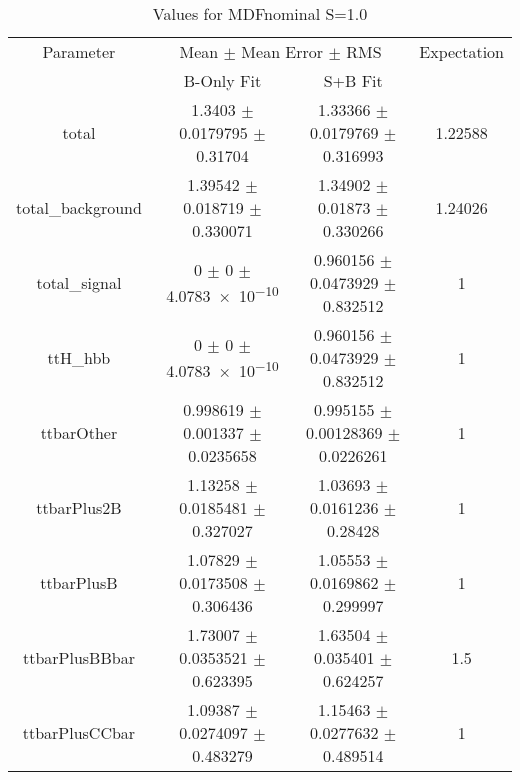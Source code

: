 \begin{table}
\centering
\caption{Values for MDFnominal S=1.0}
\begin{tabular}{cccc}
\toprule
Parameter & \multicolumn{2}{c}{Mean $\pm$ Mean Error $\pm$ RMS} & Expectation\\
 & B-Only Fit & S+B Fit & \\
\midrule
total & \num{1.3403} $\pm$ \num{0.0179795} $\pm$ \num{0.31704} & \num{1.33366} $\pm$ \num{0.0179769} $\pm$ \num{0.316993} & \num{1.22588}\\
total\_background & \num{1.39542} $\pm$ \num{0.018719} $\pm$ \num{0.330071} & \num{1.34902} $\pm$ \num{0.01873} $\pm$ \num{0.330266} & \num{1.24026}\\
total\_signal & \num{0} $\pm$ \num{0} $\pm$ \num{4.0783e-10} & \num{0.960156} $\pm$ \num{0.0473929} $\pm$ \num{0.832512} & \num{1}\\
ttH\_hbb & \num{0} $\pm$ \num{0} $\pm$ \num{4.0783e-10} & \num{0.960156} $\pm$ \num{0.0473929} $\pm$ \num{0.832512} & \num{1}\\
ttbarOther & \num{0.998619} $\pm$ \num{0.001337} $\pm$ \num{0.0235658} & \num{0.995155} $\pm$ \num{0.00128369} $\pm$ \num{0.0226261} & \num{1}\\
ttbarPlus2B & \num{1.13258} $\pm$ \num{0.0185481} $\pm$ \num{0.327027} & \num{1.03693} $\pm$ \num{0.0161236} $\pm$ \num{0.28428} & \num{1}\\
ttbarPlusB & \num{1.07829} $\pm$ \num{0.0173508} $\pm$ \num{0.306436} & \num{1.05553} $\pm$ \num{0.0169862} $\pm$ \num{0.299997} & \num{1}\\
ttbarPlusBBbar & \num{1.73007} $\pm$ \num{0.0353521} $\pm$ \num{0.623395} & \num{1.63504} $\pm$ \num{0.035401} $\pm$ \num{0.624257} & \num{1.5}\\
ttbarPlusCCbar & \num{1.09387} $\pm$ \num{0.0274097} $\pm$ \num{0.483279} & \num{1.15463} $\pm$ \num{0.0277632} $\pm$ \num{0.489514} & \num{1}\\
\bottomrule
\end{tabular}
\end{table}
